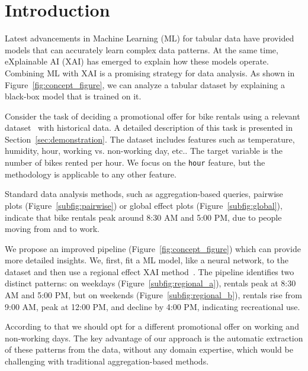 \documentclass[
twocolumn,
]{ceurart}
\begin{document}
\maketitle


\section{Introduction}
\label{sec:introduction}

Latest advancements in Machine Learning (ML) for tabular data have provided models that can accurately learn complex data patterns.
At the same time, eXplainable AI (XAI) has emerged to explain how these models operate.
Combining ML with XAI is a promising strategy for data analysis. As shown in Figure~\ref{fig:concept_figure}, we can analyze a tabular dataset by explaining a black-box model that is trained on it.

Consider the task of deciding a promotional offer for bike rentals using a relevant dataset~\cite{fanaee2014event} with historical data. A detailed description of this task is presented in Section~\ref{sec:demonstration}. The dataset includes features such as temperature, humidity, hour, working vs. non-working day, etc.. The target variable is the number of bikes rented per hour. We focus on the \texttt{hour} feature, but the methodology is applicable to any other feature.

Standard data analysis methods, such as aggregation-based queries, pairwise plots (Figure~\ref{subfig:pairwise}) or global effect plots (Figure~\ref{subfig:global}), indicate that bike rentals peak around 8:30 AM and 5:00 PM, due to people moving from and to work.

We propose an improved pipeline (Figure~\ref{fig:concept_figure}) which can provide more detailed insights. We, first, fit a ML model, like a neural network, to the dataset and then use a regional effect XAI method~\cite{herbinger2023decomposing, herbinger_repid_2022}.
The pipeline identifies two distinct patterns: on weekdays (Figure~\ref{subfig:regional_a}), rentals peak at 8:30 AM and 5:00 PM, but on weekends (Figure~\ref{subfig:regional_b}), rentals rise from 9:00 AM, peak at 12:00 PM, and decline by 4:00 PM, indicating recreational use.

According to that we should opt for a different promotional offer on working and non-working days. The key advantage of our approach is the automatic extraction of these patterns from the data, without any domain expertise, which would be challenging with traditional aggregation-based methods.
\end{document}
